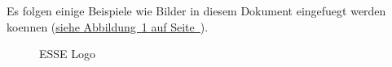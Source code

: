 \documentclass[12pt,a4paper,titlepage,oneside]{scrartcl}
\begin{document}
Es folgen einige Beispiele wie Bilder in diesem Dokument eingefuegt werden koennen
(\hyperref[fig:logo1]{siehe Abbildung~\ref*{fig:logo1} auf Seite~\pageref*{fig:logo1}}).

\begin{figure}[h!]
  \centering
  \caption{ESSE Logo}
  \label{fig:logo1}
\end{figure}


%
%
\end{document}
